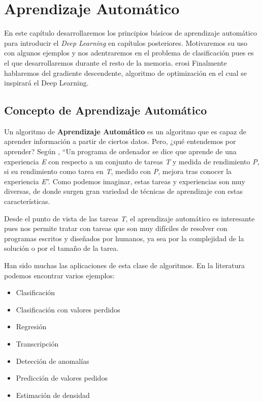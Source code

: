 \chapter{Aprendizaje Automático}

	En este capítulo desarrollaremos los principios básicos de aprendizaje automático para introducir el \textit{Deep Learning} en capítulos posteriores. Motivaremos su uso con algunos ejemplos y nos adentraremos en el problema de clasificación pues es el que desarrollaremos durante el resto de la memoria. 
erosi	
	Finalmente hablaremos del gradiente descendente, algoritmo de optimización en el cual se inspirará el Deep Learning.
	
	
\section{Concepto de Aprendizaje Automático}\label{introap}

	Un algoritmo de \textbf{Aprendizaje Automático} es un algoritmo que es capaz de aprender información a partir de ciertos datos.  Pero, ¿qué entendemos por aprender? Según \cite{mitchell}, ``Un programa de ordenador se dice que aprende de una experiencia \textit{E} con respecto a un conjunto de tareas \textit{T} y medida de rendimiento \textit{P}, si su rendimiento como tarea en \textit{T}, medido con \textit{P}, mejora tras conocer la experiencia \textit{E}''. Como podemos imaginar, estas tareas y experiencias son muy diversas, de donde surgen gran variedad de técnicas de aprendizaje con estas características.
	
	Desde  el punto de vista de las tareas \textit{T}, el aprendizaje automático es interesante pues nos permite tratar con tareas que son muy difíciles de resolver con programas escritos y diseñados por humanos, ya sea por la complejidad de la solución o por el tamaño de la tarea.
	
	Han sido muchas las aplicaciones de esta clase de algoritmos. En la literatura podemos encontrar varios ejemplos:
	
	\begin{itemize}
		\item Clasificación
		\item Clasificación con valores perdidos
		\item Regresión
		\item Transcripción
		\item Detección de anomalías
		\item Predicción de valores pedidos
		\item Estimación de densidad
	\end{itemize}
	
